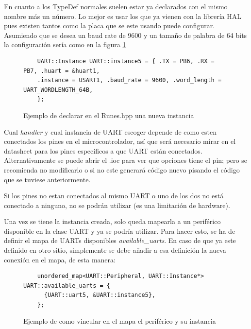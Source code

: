 \documentclass{report}
\begin{document}
En cuanto a los TypeDef normales suelen estar ya declarados con el mismo nombre más un número. Lo mejor es usar los que ya vienen con la librería HAL pues existen tantos como la placa que se este usando puede configurar. Asumiendo que se desea un baud rate de 9600 y un tamaño de palabra de 64 bits la configuración sería como en la figura \ref{UARTinstanceRunes}

\begin{figure}[h]
  \begin{lstlisting}
    UART::Instance UART::instance5 = { .TX = PB6, .RX = PB7, .huart = &huart1,
    .instance = USART1, .baud_rate = 9600, .word_length = UART_WORDLENGTH_64B,
    };
  \end{lstlisting}
\caption{Ejemplo de declarar en el Runes.hpp una nueva instancia}
\label{UARTinstanceRunes}
\end{figure}
\par \vspace{0.3cm}

Cual \textit{handler} y cual instancia de UART escoger depende de como esten conectados los pines en el microcontrolador, así que será necesario mirar en el datasheet para los pines específicos a que UART están conectados. Alternativamente se puede abrir el .ioc para ver que opciones tiene el pin; pero se recomienda no modificarlo o si no este generará código nuevo pisando el código que se tuviese anteriormente. 
\par 
Si los pines no estan conectados al mismo UART o uno de los dos no está conectado a ninguno, no se podrán utilizar (es una limitación de hardware).  
\par \vspace{0.3cm}
Una vez se tiene la instancia creada, solo queda mapearla a un periférico disponible en la clase UART y ya se podría utilizar. Para hacer esto, se ha de definir el mapa de UARTs disponibles \textit{available\_uarts}. En caso de que ya este definido en otro sitio, simplemente se debe añadir a esa definición la nueva conexión en el mapa, de esta manera: 

\begin{figure}[h]
  \begin{lstlisting}
    unordered_map<UART::Peripheral, UART::Instance*> UART::available_uarts = {
      {UART::uart5, &UART::instance5},
    };
  \end{lstlisting}
\caption{Ejemplo de como vincular en el mapa el periférico y su instancia}
\label{UARTavailableMap}
\end{figure}
\par \vspace{0.3cm}
\end{document}
